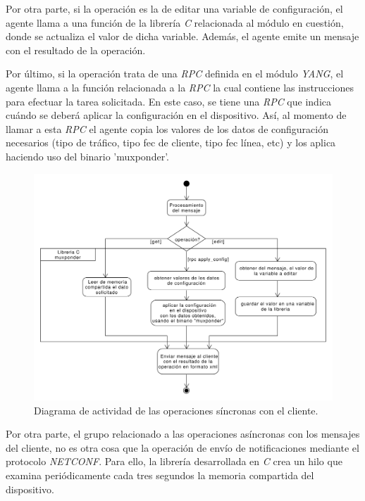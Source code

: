   Por otra parte, si la operación es la de editar una variable de configuración, el agente llama a una función de la librería \textit{C} relacionada al módulo en cuestión, donde se actualiza el valor de dicha variable. Además, el agente emite un mensaje con el resultado de la operación. 

  Por último, si la operación trata de una \textit{RPC} definida en el módulo \textit{YANG}, el agente llama a la función relacionada a la \textit{RPC} la cual contiene las instrucciones para efectuar la tarea solicitada. En este caso, se tiene una \textit{RPC} que indica cuándo se deberá aplicar la configuración en el dispositivo. Así, al momento de llamar a esta \textit{RPC} el agente copia los valores de los datos de configuración necesarios (tipo de tráfico, tipo fec de cliente, tipo fec línea, etc) y los aplica haciendo uso del binario 'muxponder'.

  \begin{figure}[H]
    \centering
    \includegraphics[scale=0.45]{Figures/actividad_modulo_sinc.pdf}
    \caption{Diagrama de actividad de las operaciones síncronas con el cliente.}
    \label{fig:actividad_modulo_sinc}
  \end{figure}

  Por otra parte, el grupo relacionado a las operaciones asíncronas con los mensajes del cliente, no es otra cosa que la operación de envío de notificaciones mediante el protocolo \textit{NETCONF}. Para ello, la librería desarrollada en \textit{C} crea un hilo que examina periódicamente cada tres segundos la memoria compartida del dispositivo. 
  
